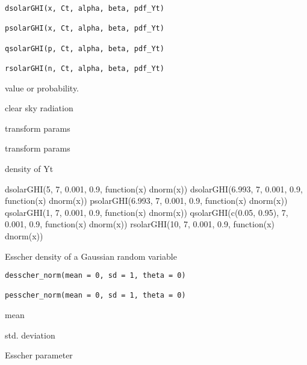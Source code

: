 \documentclass[a4paper]{book}
\begin{document}
%
\begin{Usage}
\begin{verbatim}
dsolarGHI(x, Ct, alpha, beta, pdf_Yt)

psolarGHI(x, Ct, alpha, beta, pdf_Yt)

qsolarGHI(p, Ct, alpha, beta, pdf_Yt)

rsolarGHI(n, Ct, alpha, beta, pdf_Yt)
\end{verbatim}
\end{Usage}
%
\begin{Arguments}
\begin{ldescription}
\item[\code{x, p}] value or probability.

\item[\code{Ct}] clear sky radiation

\item[\code{alpha}] transform params

\item[\code{beta}] transform params

\item[\code{pdf\_Yt}] density of Yt
\end{ldescription}
\end{Arguments}
%
\begin{Examples}
\begin{ExampleCode}
dsolarGHI(5, 7, 0.001, 0.9, function(x) dnorm(x))
dsolarGHI(6.993, 7, 0.001, 0.9, function(x) dnorm(x))
psolarGHI(6.993, 7, 0.001, 0.9, function(x) dnorm(x))
qsolarGHI(1, 7, 0.001, 0.9, function(x) dnorm(x))
qsolarGHI(c(0.05, 0.95), 7, 0.001, 0.9, function(x) dnorm(x))
rsolarGHI(10, 7, 0.001, 0.9, function(x) dnorm(x))
\end{ExampleCode}
\end{Examples}
%
\begin{Description}\relax
Esscher density of a Gaussian random variable
\end{Description}
%
\begin{Usage}
\begin{verbatim}
desscher_norm(mean = 0, sd = 1, theta = 0)

pesscher_norm(mean = 0, sd = 1, theta = 0)
\end{verbatim}
\end{Usage}
%
\begin{Arguments}
\begin{ldescription}
\item[\code{mean}] mean

\item[\code{sd}] std. deviation

\item[\code{theta}] Esscher parameter
\end{ldescription}
\end{Arguments}
\end{document}
